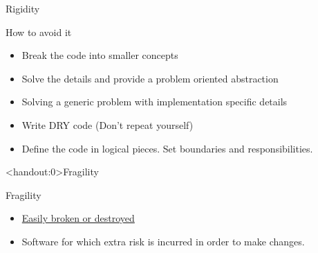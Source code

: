 \documentclass[xcolor=svgnames]{beamer}
\begin{document}

{%
%
\begin{frame}{Rigidity}

    How to avoid it
    \begin{itemize}
        \item<1-> Break the code into smaller concepts
        \item<2-> Solve the details and provide a problem oriented abstraction
        \item<3-> Solving a generic problem with implementation specific details
        \item<4-> Write DRY code (Don't repeat yourself)
        \item<5-> Define the code in logical pieces.  Set boundaries and
            responsibilities.
    \end{itemize}
\end{frame}
}


{%
%
\begin{frame}<handout:0>{Fragility}
\end{frame}
}

{%
%
\begin{frame}{Fragility}

    \begin{itemize}
        \item \href{https://www.merriam-webster.com/dictionary/fragile}
            {Easily broken or destroyed}
        \item<2-> Software for which extra risk is incurred in order to make
            changes.
    \end{itemize}
\end{frame}
}

\end{document}
